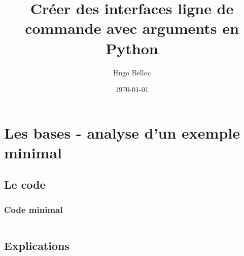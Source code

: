\documentclass{beamer}
\title[Le module argparse]{Créer des interfaces ligne de commande avec arguments en Python}
\author{Hugo Belloc}
\date{\today}
\begin{document}
\begin{frame}
 \titlepage
\end{frame}

\begin{frame}
 \tableofcontents
\end{frame}

% 
%  
%  
%  
% 
% 
% 

\section{Les bases - analyse d'un exemple minimal}
\subsection{Le code}

\begin{frame}
 \frametitle{Code minimal}
   
\inputminted[fontsize=\fontsize{8}{9}]{python}{py_src/py_argparse/argparse_minimal.py}

\end{frame}

\subsection{Explications}
\end{document}
